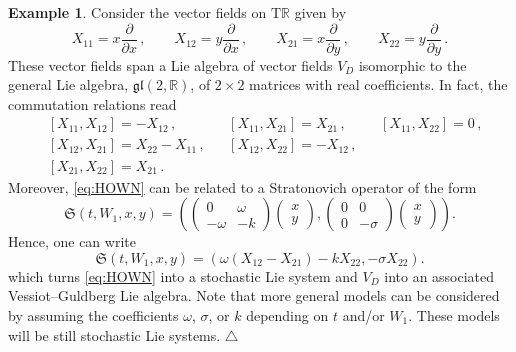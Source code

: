 \documentclass[11pt]{article}
\theoremstyle{plain}
\theoremstyle{definition}
\newcommand\xqed[1]{%
    \leavevmode\unskip\penalty9999 \hbox{}\nobreak\hfill
	\quad\hbox{#1}}
\newcommand\demo{\xqed{$\triangle$}}
\newtheorem{example}[theorem]{Example}
\newcommand{\T}{\mathrm{T}}
\begin{document}
\begin{example}
Consider the vector fields on $\T \mathbb{R}$ given by
\begin{equation}\label{Eq:BaGL22}
 X_{11}=x\frac{\partial}{\partial x}\,,\qquad X_{12}=y\frac{\partial}{\partial x}\,,\qquad X_{21}=x\frac{\partial}{\partial y}\,,\qquad X_{22}=y\frac{\partial}{\partial y}\,.
\end{equation}
 These vector fields span a Lie algebra of vector fields $V_D$ isomorphic to the general Lie algebra, $\mathfrak{gl}(2,\mathbb{R})$, of $2\times 2$ matrices with real coefficients. In fact, the commutation relations read
 \begin{align*}
 & [X_{11},X_{12}] = -X_{12}\,, && [X_{11}, X_{21}] = X_{21}\,, && [X_{11}, X_{22}] = 0\,,\\
 & [X_{12}, X_{21}] = X_{22} - X_{11}\,, && [X_{12},X_{22}] = -X_{12}\,,\\
 & [X_{21},X_{22}] = X_{21}\,.
 \end{align*}
Moreover, \eqref{eq:HOWN} can be related to a Stratonovich operator of the form
$$ \mathfrak{S}(t, W_1, x, y)=\left(\begin{pmatrix} 0 & \omega \\ -\omega & -k \end{pmatrix}\begin{pmatrix}x\\y\end{pmatrix},\begin{pmatrix}0 & 0 \\ 0 & -\sigma\end{pmatrix}\begin{pmatrix}x\\y\end{pmatrix}\right). $$
Hence, one can write
$$
\mathfrak{S}(t, W_1, x, y)=\left(\omega (X_{12}-X_{21})-kX_{22},-\sigma X_{22}\right). 
$$
which turns \eqref{eq:HOWN} into a stochastic Lie system and $V_D$ into an associated Vessiot--Guldberg Lie algebra. Note that more general models can be considered by assuming the coefficients $\omega$, $\sigma$, or $k$ depending on $t$ and/or $W_1$. These models will be still stochastic Lie systems.
\demo
\end{example}
\end{document}
